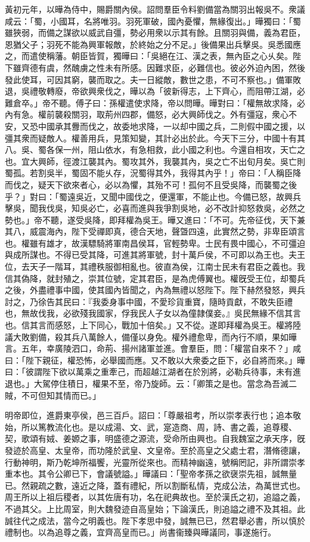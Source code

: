 \begin{pinyinscope}
黃初元年，以曄為侍中，賜爵關內侯。詔問羣臣令料劉備當為關羽出報吳不。衆議咸云：「蜀，小國耳，名將唯羽。羽死軍破，國內憂懼，無緣復出。」曄獨曰：「蜀雖狹弱，而備之謀欲以威武自彊，勢必用衆以示其有餘。且關羽與備，義為君臣，恩猶父子；羽死不能為興軍報敵，於終始之分不足。」後備果出兵擊吳。吳悉國應之，而遣使稱藩。朝臣皆賀，獨曄曰：「吳絕在江、漢之表，無內臣之心乆矣。陛下雖齊德有虞，然醜虜之性未有所感。因難求臣，必難信也。彼必外迫內困，然後發此使耳，可因其窮，襲而取之。夫一日縱敵，數世之患，不可不察也。」備軍敗退，吳禮敬轉廢，帝欲興衆伐之，曄以為「彼新得志，上下齊心，而阻帶江湖，必難倉卒。」帝不聽。傅子曰：孫權遣使求降，帝以問曄。曄對曰：「權無故求降，必內有急。權前襲殺關羽，取荊州四郡，備怒，必大興師伐之。外有彊寇，衆心不安，又恐中國承其釁而伐之，故委地求降，一以却中國之兵，二則假中國之援，以彊其衆而疑敵人。權善用兵，見策知變，其計必出於此。今天下三分，中國十有其八。吳、蜀各保一州，阻山依水，有急相救，此小國之利也。今還自相攻，天亡之也。宜大興師，徑渡江襲其內。蜀攻其外，我襲其內，吳之亡不出旬月矣。吳亡則蜀孤。若割吳半，蜀固不能乆存，況蜀得其外，我得其內乎！」帝曰：「人稱臣降而伐之，疑天下欲來者心，必以為懼，其殆不可！孤何不且受吳降，而襲蜀之後乎？」對曰：「蜀遠吳近，又聞中國伐之，便還軍，不能止也。今備已怒，故興兵擊吳，聞我伐吳，知吳必亡，必喜而進與我爭割吳地，必不改計抑怒救吳，必然之勢也。」帝不聽，遂受吳降，即拜權為吳王。曄又進曰：「不可。先帝征伐，天下兼其八，威震海內，陛下受禪即真，德合天地，聲曁四遠，此實然之勢，非卑臣頌言也。權雖有雄才，故漢驃騎將軍南昌侯耳，官輕勢卑。士民有畏中國心，不可彊迫與成所謀也。不得已受其降，可進其將軍號，封十萬戶侯，不可即以為王也。夫王位，去天子一階耳，其禮秩服御相亂也。彼直為侯，江南士民未有君臣之義也。我信其偽降，就封殖之，崇其位號，定其君臣，是為虎傅翼也。權旣受王位，却蜀兵之後，外盡禮事中國，使其國內皆聞之，內為無禮以怒陛下。陛下赫然發怒，興兵討之，乃徐告其民曰：『我委身事中國，不愛珍貨重寶，隨時貢獻，不敢失臣禮也，無故伐我，必欲殘我國家，俘我民人子女以為僮隷僕妾。』吳民無緣不信其言也。信其言而感怒，上下同心，戰加十倍矣。」又不從。遂即拜權為吳王。權將陸議大敗劉備，殺其兵八萬餘人，備僅以身免。權外禮愈卑，而內行不順，果如曄言。五年，幸廣陵泗口，命荊、揚州諸軍並進。會羣臣，問：「權當自來不？」咸曰：「陛下親征，權恐怖，必舉國而應。又不敢以大衆委之臣下，必自將而來。」曄曰：「彼謂陛下欲以萬乘之重牽己，而超越江湖者在於別將，必勒兵待事，未有進退也。」大駕停住積日，權果不至，帝乃旋師。云：「卿策之是也。當念為吾滅二賊，不可但知其情而已。」

明帝即位，進爵東亭侯，邑三百戶。詔曰：「尊嚴祖考，所以崇孝表行也；追本敬始，所以篤教流化也。是以成湯、文、武，寔造商、周，詩、書之義，追尊稷、契，歌頌有娀、姜嫄之事，明盛德之源流，受命所由興也。自我魏室之承天序，旣發迹於高皇、太皇帝，而功隆於武皇、文皇帝。至於高皇之父處士君，潛脩德讓，行動神明，斯乃乾坤所福饗，光靈所從來也。而精神幽遠，號稱罔記，非所謂崇孝重本也。其令公卿已下，會議號謚。」曄議曰：「聖帝孝孫之欲襃崇先祖，誠無量已。然親疏之數，遠近之降，蓋有禮紀，所以割斷私情，克成公法，為萬世式也。周王所以上祖后稷者，以其佐唐有功，名在祀典故也。至於漢氏之初，追謚之義，不過其父。上比周室，則大魏發迹自高皇始；下論漢氏，則追謚之禮不及其祖。此誠往代之成法，當今之明義也。陛下孝思中發，誠無已已，然君舉必書，所以慎於禮制也。以為追尊之義，宜齊高皇而已。」尚書衞臻與曄議同，事遂施行。


\end{pinyinscope}
